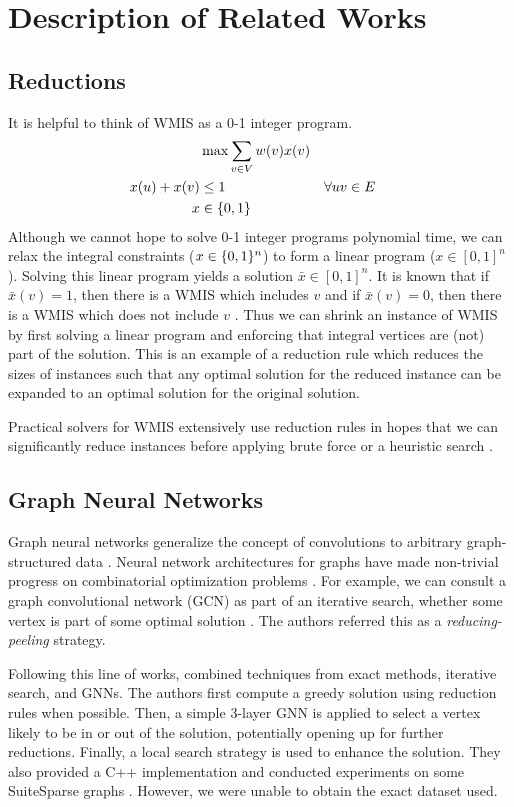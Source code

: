 \documentclass{article}
\DeclarePairedDelimiter{\set}{\lbrace}{\rbrace}
\begin{document}
\section{Description of Related Works}
\subsection{Reductions}
It is helpful to think of WMIS as a 0-1 integer program.
\begin{align*}
  &\max \sum_{v\in V} w(v) x(v) \\
  x(u) + x(v) &\leq 1 &&\forall uv\in E \\
  x &\in \set{0, 1}
\end{align*}
Although we cannot hope to solve 0-1 integer programs polynomial time,
we can relax the integral constraints ($x\in \set{0, 1}^n$)
to form a linear program ($x\in [0, 1]^n$).
Solving this linear program yields a solution $\bar x\in [0, 1]^n$.
It is known that if $\bar x(v) = 1$,
then there is a WMIS which includes $v$
and if $\bar x(v) = 0$,
then there is a WMIS which does not include $v$ \citet{lpreduction}.
Thus we can shrink an instance of WMIS by first solving a linear program
and enforcing that integral vertices are (not) part of the solution.
This is an example of a reduction rule which reduces the sizes of instances
such that any optimal solution for the reduced instance can be expanded to an optimal solution
for the original solution.

Practical solvers for WMIS extensively use reduction rules
in hopes that we can significantly reduce instances
before applying brute force or a heuristic search \cite{kamis}.

\subsection{Graph Neural Networks}
Graph neural networks generalize the concept of convolutions to arbitrary graph-structured data \citet{scarselli2008graph}.
Neural network architectures for graphs have made non-trivial progress on combinatorial optimization problems \citet{cappart2021combinatorial}.
For example, we can consult a graph convolutional network (GCN) as part of an iterative search,
whether some vertex is part of some optimal solution \citet{comboptgcn}.
The authors referred this as a \emph{reducing-peeling} strategy.

Following this line of works,
\citet{langedal_et_al} combined techniques from exact methods,
iterative search,
and GNNs.
The authors first compute a greedy solution using reduction rules when possible.
Then, a simple 3-layer GNN is applied to select a vertex likely to be in or out of the solution,
potentially opening up for further reductions.
Finally, a local search strategy is used to enhance the solution.
They also provided a C++ implementation
and conducted experiments on some SuiteSparse graphs \citet{suitesparse}.
However, we were unable to obtain the exact dataset used.
\end{document}
